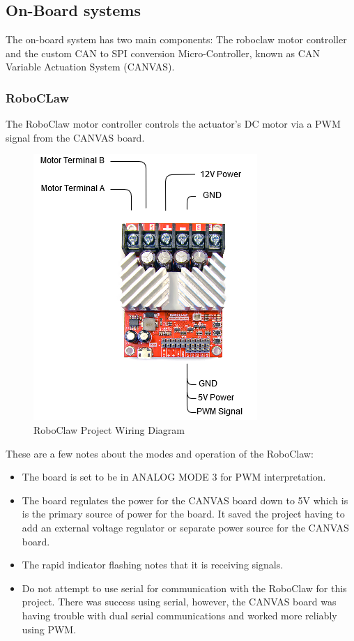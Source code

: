 \documentclass{article}
\begin{document}
\subsection{On-Board systems}
The on-board system has two main components: The roboclaw motor controller and the custom CAN to SPI conversion Micro-Controller, known as CAN Variable Actuation System (CANVAS).

\subsubsection{RoboCLaw}
The RoboClaw motor controller controls the actuator's DC motor via a PWM signal from the CANVAS board. 
\newline 
\begin{figure}[h!]
\centering
\includegraphics[scale=0.6]{ME_490_Drawings.png}
\caption{RoboClaw Project Wiring Diagram}
\label{fig:roboclaw}
\end{figure}

These are a few notes about the modes and operation of the RoboClaw:
\begin{itemize}
    \item The board is set to be in ANALOG MODE 3 for PWM interpretation.
    \item The board regulates the power for the CANVAS board down to 5V which is is the primary source of power for the board. It saved the project having to add an external voltage regulator or separate power source for the CANVAS board.
    \item The rapid indicator flashing notes that it is receiving signals.
    \item Do not attempt to use serial for communication with the RoboClaw for this project. There was success using serial, however, the CANVAS board was having trouble with dual serial communications and worked more reliably using PWM.
\end{itemize}
\end{document}
